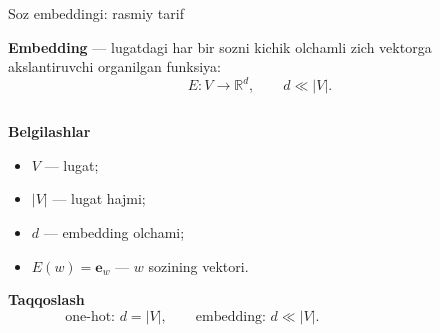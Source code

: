 \documentclass[aspectratio=169,11pt]{beamer}
\begin{document}
\begin{frame}{So\textquotesingle{}z embeddingi: rasmiy ta\textquotesingle{}rif}
\footnotesize

\begin{tcolorbox}[defbox]
\textbf{Embedding} — lug\textquotesingle{}atdagi har bir so\textquotesingle{}zni
kichik o\textquotesingle{}lchamli zich vektorga akslantiruvchi
o\textquotesingle{}rganilgan funksiya:
\[
    E: V \rightarrow \mathbb{R}^{d}, \qquad d \ll |V|.
\]
\end{tcolorbox}

\vspace{2pt}

\begin{columns}[T,totalwidth=\textwidth]
\begin{column}{0.46\textwidth}
\textbf{Belgilashlar}
\begin{itemize}\setlength\itemsep{3pt}
    \item $V$ — lug\textquotesingle{}at;
    \item $|V|$ — lug\textquotesingle{}at hajmi;
    \item $d$ — embedding o\textquotesingle{}lchami;
    \item $E(w)=\mathbf{e}_w$ — $w$ so\textquotesingle{}zining vektori.
\end{itemize}

\vspace{3pt}

\textbf{Taqqoslash}
\[
\text{one-hot: } d=|V|,\qquad
\text{embedding: } d\ll |V|.
\]
\end{column}

\begin{column}{0.50\textwidth}
\centering
{}
\end{column}
\end{columns}
\end{frame}
\end{document}
